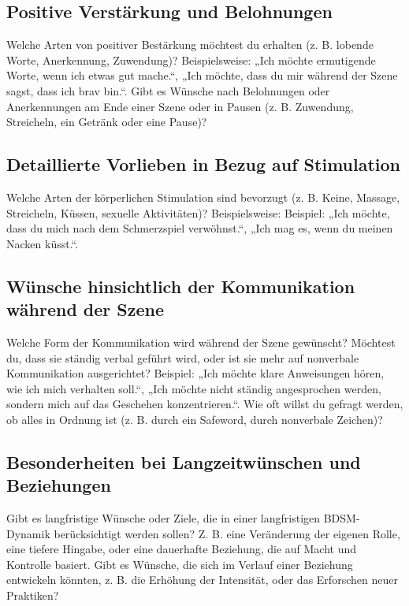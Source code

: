 \documentclass[a4paper,12pt]{article}
\begin{document}
\newpage

\subsection{Positive Verstärkung und Belohnungen}
\noindent Welche Arten von positiver Bestärkung möchtest du erhalten (z. B. lobende Worte, Anerkennung, Zuwendung)? Beispielsweise: „Ich möchte ermutigende Worte, wenn ich etwas gut mache.“, „Ich möchte, dass du mir während der Szene sagst, dass ich brav bin.“. Gibt es Wünsche nach Belohnungen oder Anerkennungen am Ende einer Szene oder in Pausen (z. B. Zuwendung, Streicheln, ein Getränk oder eine Pause)?\newline
\noindent \TextField[name=WuenscheVerst,multiline=true,height=20em, width=37em]{}

\subsection{Detaillierte Vorlieben in Bezug auf Stimulation}
\noindent Welche Arten der körperlichen Stimulation sind bevorzugt (z. B. Keine, Massage, Streicheln, Küssen, sexuelle Aktivitäten)? Beispielsweise: Beispiel: „Ich möchte, dass du mich nach dem Schmerzspiel verwöhnst.“, „Ich mag es, wenn du meinen Nacken küsst.“.\newline
\noindent \TextField[name=WuenscheStimu,multiline=true,height=20em, width=37em]{}

\newpage

\subsection{Wünsche hinsichtlich der Kommunikation während der Szene}
\noindent Welche Form der Kommunikation wird während der Szene gewünscht? Möchtest du, dass sie ständig verbal geführt wird, oder ist sie mehr auf nonverbale Kommunikation ausgerichtet? Beispiel: „Ich möchte klare Anweisungen hören, wie ich mich verhalten soll.“, „Ich möchte nicht ständig angesprochen werden, sondern mich auf das Geschehen konzentrieren.“. Wie oft willst du gefragt werden, ob alles in Ordnung ist (z. B. durch ein Safeword, durch nonverbale Zeichen)? \newline
\noindent \TextField[name=WuenscheKomm,multiline=true,height=20em, width=37em]{}

\subsection{Besonderheiten bei Langzeitwünschen und Beziehungen}
\noindent Gibt es langfristige Wünsche oder Ziele, die in einer langfristigen BDSM-Dynamik berücksichtigt werden sollen? Z. B. eine Veränderung der eigenen Rolle, eine tiefere Hingabe, oder eine dauerhafte Beziehung, die auf Macht und Kontrolle basiert. Gibt es Wünsche, die sich im Verlauf einer Beziehung entwickeln könnten, z. B. die Erhöhung der Intensität, oder das Erforschen neuer Praktiken? \newline
\noindent \TextField[name=WuenscheLangzeit,multiline=true,height=15em, width=37em]{}
\end{document}
